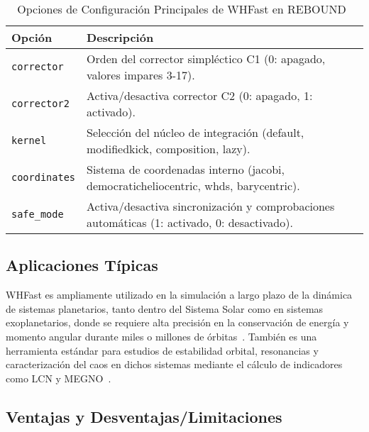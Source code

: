 \begin{table}[H]
\centering
\caption{Opciones de Configuración Principales de WHFast en REBOUND~\cite{ReboundIntegratorsDoc}}%
\label{tab:whfast_options}
    \begin{tabular}{lp{10cm}}
    \hline
    \textbf{Opción} & \textbf{Descripción} \\
    \hline
    \texttt{corrector} & Orden del corrector simpléctico C1 (0: apagado, valores impares 3-17). \\
    \texttt{corrector2} & Activa/desactiva corrector C2 (0: apagado, 1: activado). \\
    \texttt{kernel} & Selección del núcleo de integración (default, modifiedkick, composition, lazy). \\
    \texttt{coordinates} & Sistema de coordenadas interno (jacobi, democraticheliocentric, whds, barycentric). \\
    \texttt{safe\_mode} & Activa/desactiva sincronización y comprobaciones automáticas (1: activado, 0: desactivado). \\
    \hline
    \end{tabular}
\end{table}

\subsection{Aplicaciones Típicas}

WHFast es ampliamente utilizado en la simulación a largo plazo de la dinámica de sistemas planetarios, tanto dentro del Sistema Solar como en sistemas exoplanetarios, donde se requiere alta precisión en la conservación de energía y momento angular durante miles o millones de órbitas~\cite{ReinTamayo2015, Rein2012}. También es una herramienta estándar para estudios de estabilidad orbital, resonancias y caracterización del caos en dichos sistemas mediante el cálculo de indicadores como LCN y MEGNO~\cite{ReinTamayo2015}.

\subsection{Ventajas y Desventajas/Limitaciones}


